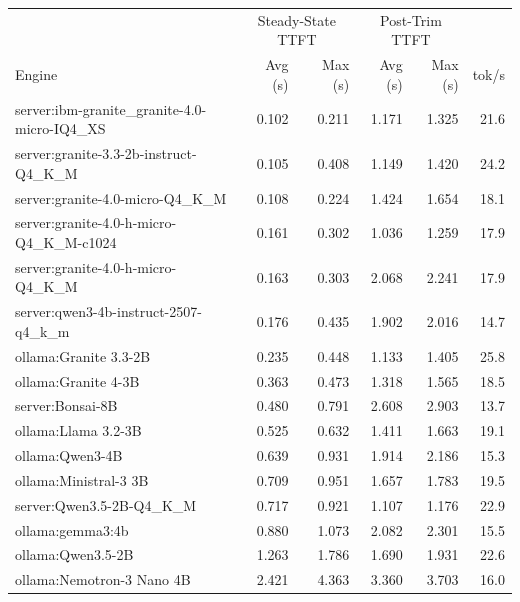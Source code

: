\begin{tabular}{l|rr|rr|r}
\toprule
& \multicolumn{2}{c|}{Steady-State TTFT} & \multicolumn{2}{c|}{Post-Trim TTFT} & \\
Engine & Avg (s) & Max (s) & Avg (s) & Max (s) & tok/s \\
\midrule
server:ibm-granite\_granite-4.0-micro-IQ4\_XS & 0.102 & 0.211 & 1.171 & 1.325 & 21.6 \\
server:granite-3.3-2b-instruct-Q4\_K\_M & 0.105 & 0.408 & 1.149 & 1.420 & 24.2 \\
server:granite-4.0-micro-Q4\_K\_M & 0.108 & 0.224 & 1.424 & 1.654 & 18.1 \\
server:granite-4.0-h-micro-Q4\_K\_M-c1024 & 0.161 & 0.302 & 1.036 & 1.259 & 17.9 \\
server:granite-4.0-h-micro-Q4\_K\_M & 0.163 & 0.303 & 2.068 & 2.241 & 17.9 \\
server:qwen3-4b-instruct-2507-q4\_k\_m & 0.176 & 0.435 & 1.902 & 2.016 & 14.7 \\
ollama:Granite 3.3-2B & 0.235 & 0.448 & 1.133 & 1.405 & 25.8 \\
ollama:Granite 4-3B & 0.363 & 0.473 & 1.318 & 1.565 & 18.5 \\
server:Bonsai-8B & 0.480 & 0.791 & 2.608 & 2.903 & 13.7 \\
ollama:Llama 3.2-3B & 0.525 & 0.632 & 1.411 & 1.663 & 19.1 \\
ollama:Qwen3-4B & 0.639 & 0.931 & 1.914 & 2.186 & 15.3 \\
ollama:Ministral-3 3B & 0.709 & 0.951 & 1.657 & 1.783 & 19.5 \\
server:Qwen3.5-2B-Q4\_K\_M & 0.717 & 0.921 & 1.107 & 1.176 & 22.9 \\
ollama:gemma3:4b & 0.880 & 1.073 & 2.082 & 2.301 & 15.5 \\
ollama:Qwen3.5-2B & 1.263 & 1.786 & 1.690 & 1.931 & 22.6 \\
ollama:Nemotron-3 Nano 4B & 2.421 & 4.363 & 3.360 & 3.703 & 16.0 \\
\bottomrule
\end{tabular}
